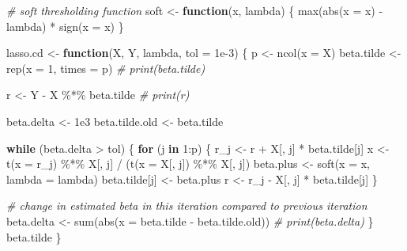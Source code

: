 \documentclass[
]{article}
\newenvironment{Shaded}{\begin{snugshade}}{\end{snugshade}}
\newcommand{\AttributeTok}[1]{\textcolor[rgb]{0.77,0.63,0.00}{#1}}
\newcommand{\CommentTok}[1]{\textcolor[rgb]{0.56,0.35,0.01}{\textit{#1}}}
\newcommand{\ControlFlowTok}[1]{\textcolor[rgb]{0.13,0.29,0.53}{\textbf{#1}}}
\newcommand{\DecValTok}[1]{\textcolor[rgb]{0.00,0.00,0.81}{#1}}
\newcommand{\FloatTok}[1]{\textcolor[rgb]{0.00,0.00,0.81}{#1}}
\newcommand{\FunctionTok}[1]{\textcolor[rgb]{0.00,0.00,0.00}{#1}}
\newcommand{\NormalTok}[1]{#1}
\newcommand{\OtherTok}[1]{\textcolor[rgb]{0.56,0.35,0.01}{#1}}
\newcommand{\SpecialCharTok}[1]{\textcolor[rgb]{0.00,0.00,0.00}{#1}}
\begin{document}
\begin{Shaded}
\begin{Highlighting}[]
\CommentTok{\# soft thresholding function}
\NormalTok{soft }\OtherTok{\textless{}{-}} \ControlFlowTok{function}\NormalTok{(x, lambda) \{}
  \FunctionTok{max}\NormalTok{(}\FunctionTok{abs}\NormalTok{(}\AttributeTok{x =}\NormalTok{ x) }\SpecialCharTok{{-}}\NormalTok{ lambda) }\SpecialCharTok{*} \FunctionTok{sign}\NormalTok{(}\AttributeTok{x =}\NormalTok{ x)}
\NormalTok{\}}

\NormalTok{lasso.cd }\OtherTok{\textless{}{-}} \ControlFlowTok{function}\NormalTok{(X, Y, lambda, }\AttributeTok{tol =} \FloatTok{1e{-}3}\NormalTok{) \{}
\NormalTok{  p }\OtherTok{\textless{}{-}} \FunctionTok{ncol}\NormalTok{(}\AttributeTok{x =}\NormalTok{ X)}
\NormalTok{  beta.tilde }\OtherTok{\textless{}{-}} \FunctionTok{rep}\NormalTok{(}\AttributeTok{x =} \DecValTok{1}\NormalTok{, }\AttributeTok{times =}\NormalTok{ p)}
  \CommentTok{\# print(beta.tilde)}
  
\NormalTok{  r }\OtherTok{\textless{}{-}}\NormalTok{ Y }\SpecialCharTok{{-}}\NormalTok{ X }\SpecialCharTok{\%*\%}\NormalTok{ beta.tilde}
  \CommentTok{\# print(r)}
  
\NormalTok{  beta.delta }\OtherTok{\textless{}{-}} \FloatTok{1e3}
\NormalTok{  beta.tilde.old }\OtherTok{\textless{}{-}}\NormalTok{ beta.tilde}
  
  \ControlFlowTok{while}\NormalTok{ (beta.delta }\SpecialCharTok{\textgreater{}}\NormalTok{ tol) \{}
    \ControlFlowTok{for}\NormalTok{ (j }\ControlFlowTok{in} \DecValTok{1}\SpecialCharTok{:}\NormalTok{p) \{}
\NormalTok{      r\_j }\OtherTok{\textless{}{-}}\NormalTok{ r }\SpecialCharTok{+}\NormalTok{ X[, j] }\SpecialCharTok{*}\NormalTok{ beta.tilde[j]}
\NormalTok{      x }\OtherTok{\textless{}{-}} \FunctionTok{t}\NormalTok{(}\AttributeTok{x =}\NormalTok{ r\_j) }\SpecialCharTok{\%*\%}\NormalTok{ X[, j] }\SpecialCharTok{/}\NormalTok{ (}\FunctionTok{t}\NormalTok{(}\AttributeTok{x =}\NormalTok{ X[, j]) }\SpecialCharTok{\%*\%}\NormalTok{ X[, j])}
\NormalTok{      beta.plus }\OtherTok{\textless{}{-}} \FunctionTok{soft}\NormalTok{(}\AttributeTok{x =}\NormalTok{ x, }\AttributeTok{lambda =}\NormalTok{ lambda)}
\NormalTok{      beta.tilde[j] }\OtherTok{\textless{}{-}}\NormalTok{ beta.plus}
\NormalTok{      r }\OtherTok{\textless{}{-}}\NormalTok{ r\_j }\SpecialCharTok{{-}}\NormalTok{ X[, j] }\SpecialCharTok{*}\NormalTok{ beta.tilde[j]}
\NormalTok{    \}}
    
    \CommentTok{\# change in estimated beta in this iteration compared to previous iteration}
\NormalTok{    beta.delta }\OtherTok{\textless{}{-}} \FunctionTok{sum}\NormalTok{(}\FunctionTok{abs}\NormalTok{(}\AttributeTok{x =}\NormalTok{ beta.tilde }\SpecialCharTok{{-}}\NormalTok{ beta.tilde.old))}
    \CommentTok{\# print(beta.delta)}
\NormalTok{  \}}
\NormalTok{  beta.tilde}
\NormalTok{\}}
\end{Highlighting}
\end{Shaded}
\end{document}
